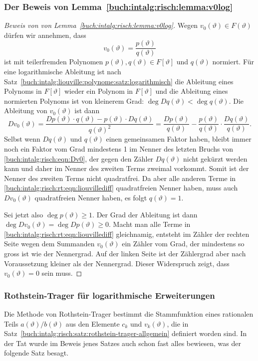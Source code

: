 \subsubsection{Der Beweis von Lemma~\ref{buch:intalg:risch:lemma:v0log}}
\begin{proof}[Beweis von von Lemma~\ref{buch:intalg:risch:lemma:v0log}]
Wegen $v_0(\vartheta)\in F(\vartheta)$
dürfen wir annehmen, dass
\[
v_0(\vartheta)
=
\frac{p(\vartheta)}{q(\vartheta)}
\]
ist mit teilerfremden Polynomen $p(\vartheta),q(\vartheta)\in F[\vartheta]$
und $q(\vartheta)$ normiert.
Für eine logarithmische Ableitung ist nach
Satz~\ref{buch:intalg:liouville:polynome:satz:logarithmisch}
die Ableitung eines Polynoms in $F[\vartheta]$ wieder ein Polynom
in $F[\vartheta]$ und die Ableitung eines normierten Polynoms ist
von kleinerem Grad:
$\deg Dq(\vartheta)<\deg q(\vartheta)$.
Die Ableitung von $v_0(\vartheta)$ ist dann
\begin{equation}
Dv_0(\vartheta)
=
\frac{
Dp(\vartheta)\cdot q(\vartheta) - p(\vartheta)\cdot Dq(\vartheta)
}{
q(\vartheta)^2
}
=
\frac{ Dp(\vartheta) }{ q(\vartheta) }
-
\frac{p(\vartheta)}{q(\vartheta)}\cdot\frac{Dq(\vartheta)}{q(\vartheta)}.
\label{buch:intalg:risch:eqn:Dv0}
\end{equation}
Selbst wenn $Dq(\vartheta)$ und $q(\vartheta)$ einen gemeinsamen Faktor haben,
bleibt immer noch ein Faktor vom Grad mindestens 1 im Nenner
des letzten Bruchs von \eqref{buch:intalg:risch:eqn:Dv0}, der gegen
den Zähler $Dq(\vartheta)$ nicht gekürzt werden kann und daher im Nenner
des zweiten Terms zweimal vorkommt.
Somit ist der Nenner des zweiten Terms nicht quadratfrei.
Da aber alle anderen Terme in
\eqref{buch:intalg:risch:rt:eqn:liouvillediff}
quadratfreien Nenner haben, muss auch $Dv_0(\vartheta)$ quadratfreien
Nenner haben, es folgt $q(\vartheta)=1$.

Sei jetzt also $\deg p(\vartheta)\ge 1$.
Der Grad der Ableitung ist dann
$\deg Dv_0(\vartheta) = \deg Dp(\vartheta) \ge 0$.
Macht man alle Terme in 
\eqref{buch:intalg:risch:rt:eqn:liouvillediff}
gleichnamig, entsteht im Zähler der rechten Seite wegen dem Summanden
$v_0(\vartheta)$ ein Zähler vom Grad, der mindestens so gross ist
wie der Nennergrad.
Auf der linken Seite ist der Zählergrad aber nach Voraussetzung 
kleiner als der Nennergrad.
Dieser Widerspruch zeigt, dass $v_0(\vartheta)=0$ sein muss.
\end{proof}

%
%
\subsubsection{Rothstein-Trager für logarithmische Erweiterungen}
Die Methode von Rothstein-Trager bestimmt die Stammfunktion eines
rationalen Teils $a(\vartheta)/b(\vartheta)$ aus den Elemente
$c_k$ und $v_k(\vartheta)$, die in
Satz~\ref{buch:intalg:risch:satz:rothstein-trager-allgemein}
definiert worden sind.
In der Tat wurde im Beweis jenes Satzes auch schon fast alles
bewiesen, was der folgende Satz besagt.

